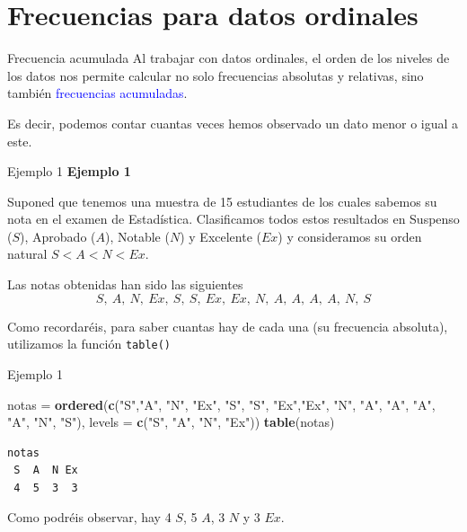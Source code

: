 \documentclass[
  ignorenonframetext,
]{beamer}
\newenvironment{Shaded}{\begin{snugshade}}{\end{snugshade}}
\newcommand{\AttributeTok}[1]{\textcolor[rgb]{0.13,0.29,0.53}{#1}}
\newcommand{\FunctionTok}[1]{\textcolor[rgb]{0.13,0.29,0.53}{\textbf{#1}}}
\newcommand{\NormalTok}[1]{#1}
\newcommand{\OtherTok}[1]{\textcolor[rgb]{0.56,0.35,0.01}{#1}}
\newcommand{\StringTok}[1]{\textcolor[rgb]{0.31,0.60,0.02}{#1}}
\newcommand\blue[1]{\textcolor{blue}{#1}}
\begin{document}
\section{Frecuencias para datos
ordinales}\label{frecuencias-para-datos-ordinales}

\begin{frame}{Frecuencia acumulada}
\label{frecuencia-acumulada}
Al trabajar con datos ordinales, el orden de los niveles de los datos
nos permite calcular no solo frecuencias absolutas y relativas, sino
también \blue{frecuencias acumuladas}.

Es decir, podemos contar cuantas veces hemos observado un dato menor o
igual a este.
\end{frame}

\begin{frame}[fragile]{Ejemplo 1}
\label{ejemplo-1}
\textbf{Ejemplo 1}

Suponed que tenemos una muestra de 15 estudiantes de los cuales sabemos
su nota en el examen de Estadística. Clasificamos todos estos resultados
en Suspenso (\(S\)), Aprobado (\(A\)), Notable (\(N\)) y Excelente
(\(Ex\)) y consideramos su orden natural \(S<A<N<Ex\).

Las notas obtenidas han sido las siguientes
\[S,\ A,\ N,\ Ex,\ S,\ S,\ Ex,\ Ex,\ N,\ A,\ A,\ A,\ A,\ N,\ S\]

Como recordaréis, para saber cuantas hay de cada una (su frecuencia
absoluta), utilizamos la función \texttt{table()}
\end{frame}

\begin{frame}[fragile]{Ejemplo 1}
\label{ejemplo-1-1}
\begin{Shaded}
\begin{Highlighting}[]
\NormalTok{notas }\OtherTok{=} \FunctionTok{ordered}\NormalTok{(}\FunctionTok{c}\NormalTok{(}\StringTok{"S"}\NormalTok{,}\StringTok{"A"}\NormalTok{, }\StringTok{"N"}\NormalTok{, }\StringTok{"Ex"}\NormalTok{, }\StringTok{"S"}\NormalTok{, }\StringTok{"S"}\NormalTok{,}
                  \StringTok{"Ex"}\NormalTok{,}\StringTok{"Ex"}\NormalTok{, }\StringTok{"N"}\NormalTok{, }\StringTok{"A"}\NormalTok{, }\StringTok{"A"}\NormalTok{, }\StringTok{"A"}\NormalTok{,}
                  \StringTok{"A"}\NormalTok{, }\StringTok{"N"}\NormalTok{, }\StringTok{"S"}\NormalTok{),}
                \AttributeTok{levels =} \FunctionTok{c}\NormalTok{(}\StringTok{"S"}\NormalTok{, }\StringTok{"A"}\NormalTok{, }\StringTok{"N"}\NormalTok{, }\StringTok{"Ex"}\NormalTok{))}
\FunctionTok{table}\NormalTok{(notas)}
\end{Highlighting}
\end{Shaded}

\begin{verbatim}
notas
 S  A  N Ex 
 4  5  3  3 
\end{verbatim}

Como podréis observar, hay 4 \(S\), 5 \(A\), 3 \(N\) y 3 \(Ex\).
\end{frame}
\end{document}
